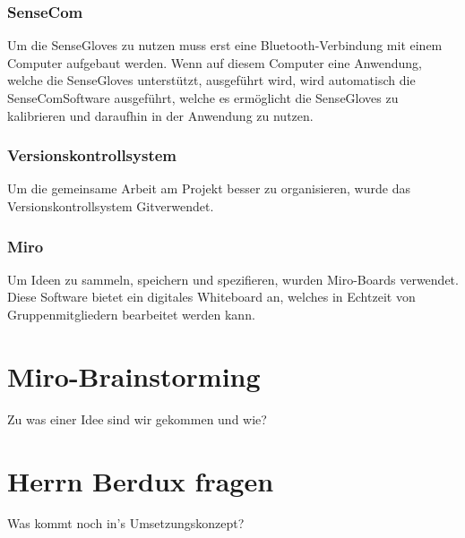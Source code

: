 \subsubsection{SenseCom}
Um die SenseGloves zu nutzen muss erst eine Bluetooth-Verbindung mit einem Computer aufgebaut werden. Wenn auf diesem Computer eine Anwendung, welche die SenseGloves unterstützt, ausgeführt wird, wird automatisch die \dq SenseCom\dq Software ausgeführt, welche es ermöglicht die SenseGloves zu kalibrieren und daraufhin in der Anwendung zu nutzen.

\subsubsection{Versionskontrollsystem}
Um die gemeinsame Arbeit am Projekt besser zu organisieren, wurde das Versionskontrollsystem \dq Git\dq verwendet.

\subsubsection{Miro}
Um Ideen zu sammeln, speichern und spezifieren, wurden Miro-Boards verwendet. Diese Software bietet ein digitales Whiteboard an, welches in Echtzeit von Gruppenmitgliedern bearbeitet werden kann.


\section{Miro-Brainstorming}
Zu was einer Idee sind wir gekommen und wie?

\section{Herrn Berdux fragen}
Was kommt noch in's Umsetzungskonzept?